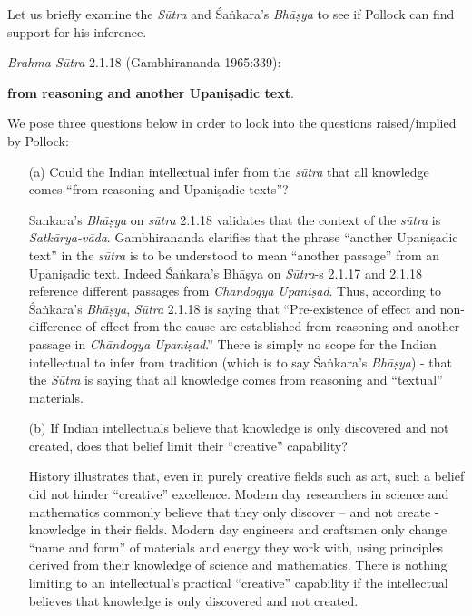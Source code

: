 Let us briefly examine the {\sl Sūtra} and Śaṅkara's {\sl Bhāṣya} to see if Pollock can find support for his inference.

{\sl Brahma Sūtra} 2.1.18 (Gambhirananda 1965:339):
\begin{myquote}
 \textbf{from reasoning and another Upaniṣadic text}.
\end{myquote}

We pose three questions below in order to look into the questions raised/implied by Pollock:
\begin{itemize}
\item[(a)] Could the Indian intellectual infer from the {\sl sūtra} that all knowledge comes ``from reasoning and Upaniṣadic texts''?

Sankara's {\sl Bhāṣya} on {\sl sūtra} 2.1.18 validates that the context of the {\sl sūtra} is {\sl Satkārya-vāda}.  Gambhirananda clarifies that the phrase ``another Upaniṣadic text'' in the {\sl sūtra} is to be understood to mean ``another passage'' from an Upaniṣadic text. Indeed Śaṅkara's Bhāṣya on {\sl Sūtra}-s 2.1.17 and 2.1.18 reference different passages from {\sl Chāndogya Upaniṣad}. Thus, according to Śaṅkara's {\sl Bhāṣya}, {\sl Sūtra} 2.1.18 is saying that ``Pre-existence of effect and non-difference of effect from the cause are established from reasoning and another passage in {\sl Chāndogya Upaniṣad}.''  There is simply no scope for the Indian intellectual to infer from tradition (which is to say Śaṅkara's {\sl Bhāṣya}) - that the {\sl Sūtra} is saying that all knowledge comes from reasoning and ``textual'' materials.

\item[(b)] If Indian intellectuals believe that knowledge is only discovered and not created, does that belief limit their ``creative'' capability?

History illustrates that, even in purely creative fields such as art, such a belief did not hinder ``creative'' excellence.  Modern day researchers in science and mathematics commonly believe that they only discover -- and not create - knowledge in their fields.  Modern day engineers and craftsmen only change ``name and form'' of materials and energy they work with, using principles derived from their knowledge of science and mathematics. There is nothing limiting to an intellectual's practical ``creative'' capability if the intellectual believes that knowledge is only discovered and not created.


\end{itemize}
